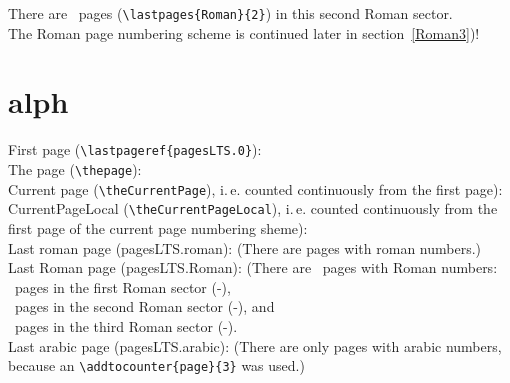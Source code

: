 \documentclass[british]{article}
\def\pagesLTSexampleArabic{3}
\begin{document}
\bigskip
There are ~pages
(\texttt{\textbackslash lastpages\{Roman\}\{2\}})
in this second Roman sector.\\
The Roman page numbering scheme is continued later in
section~\ref{Roman3})!

\newpage


\section{alph\label{alph}}

\noindent First page (\texttt{\textbackslash lastpageref\{pagesLTS.0\}}):
 \\

\noindent The page (\texttt{\textbackslash thepage}): \thepage \\

\noindent Current page (\texttt{\textbackslash theCurrentPage}),
i.\,e. counted continuously from the first page): \theCurrentPage \\

\noindent CurrentPageLocal (\texttt{\textbackslash theCurrentPageLocal}),
i.\,e. counted continuously from the first page of the
current page numbering sheme): \theCurrentPageLocal \\

\noindent Last roman page (pagesLTS.roman): 
(There are  pages with roman numbers.)\\

\noindent Last Roman page (pagesLTS.Roman): 
(There are ~pages with Roman numbers:\\
~pages in the first Roman sector
(\pageref{Roman}{\hskip3em }-),\\
~pages in the second Roman sector
(\pageref{Roman2}{\hskip3em }-), and\\
~pages in the third Roman sector
(\pageref{Roman3}{\hskip3em }-).\\

\noindent Last arabic page (pagesLTS.arabic): 
(There are only  pages with arabic numbers,
because an \texttt{\textbackslash addtocounter\{page\}\{\pagesLTSexampleArabic\}} was used.)\\
\end{document}
